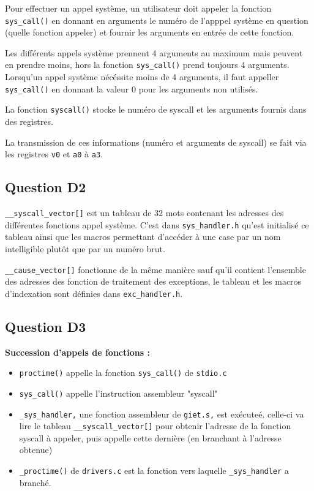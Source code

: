 \documentclass{article}
\begin{document}
Pour effectuer un appel système, un utilisateur doit appeler la fonction
\texttt{sys\_call()} en donnant en arguments le numéro de l'apppel système en
question (quelle fonction appeler) et fournir les arguments en entrée
de cette fonction.

Les différents appels système prennent 4 arguments au maximum mais peuvent
en prendre moins, hors la fonction \texttt{sys\_call()} prend toujours 4 arguments.
Lorsqu'un appel système nécéssite moins de 4 arguments, il faut appeller
\texttt{sys\_call()} en donnant la valeur 0 pour les arguments non utilisés.

La fonction \texttt{syscall()} stocke le numéro de syscall et les arguments fournis
dans des registres. 

La transmission de ces informations (numéro et arguments de syscall)
se fait via les registres \texttt{v0} et \texttt{a0} à \texttt{a3}.

\subsection{Question D2}

\texttt{\_\_syscall\_vector[]} est un tableau de 32 mots contenant les adresses
des différentes fonctions appel système. C'est dans \texttt{sys\_handler.h} 
qu'est initialisé ce tableau ainsi que les macros permettant d'accéder à une
case par un nom intelligible plutôt que par un numéro brut.

\texttt{\_\_cause\_vector[]} fonctionne de la même manière sauf qu'il contient
l'ensemble des adresses des fonction de traitement des exceptions,
le tableau et les macros d'indexation sont définies dans \texttt{exc\_handler.h}.

\subsection{Question D3}

\textbf{Succession d'appels de fonctions :}
\begin{itemize}
\item \texttt{proctime()} appelle la fonction \texttt{sys\_call()} de \texttt{stdio.c}
\item \texttt{sys\_call()} appelle l'instruction assembleur "syscall"
\item \texttt{\_sys\_handler,} une fonction assembleur de \texttt{giet.s,} est exécuteé.
	celle-ci va lire le tableau \texttt{\_\_syscall\_vector[]} pour obtenir
	l'adresse de la fonction syscall à appeler, puis appelle
	cette dernière (en branchant à l'adresse obtenue)
\item \texttt{\_proctime()} de \texttt{drivers.c} est la fonction vers laquelle
\texttt{\_sys\_handler} a branché.
\end{itemize}
\end{document}
